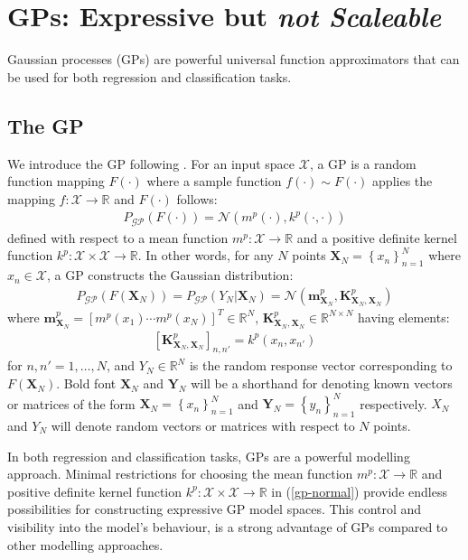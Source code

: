 \documentclass{article}
\newcommand{\GP}{\operatorname{\mathcal{GP}}}
\numberwithin{equation}{section}
\begin{document}
\section{GPs: Expressive but \textit{not Scaleable}}
Gaussian processes (GPs) are powerful universal function approximators that can be used for both regression and classification tasks. 
\subsection{The GP}\label{section:the-gp}
We introduce the GP following \cite{rasmussen2003gaussian}. For an input space $\mathcal{X}$, a GP is a random function mapping $F(\cdot)$ where a sample function $f(\cdot) \sim F(\cdot)$ applies the mapping $f: \mathcal{X} \rightarrow \mathbb{R}$ and $F(\cdot)$ follows:
\begin{align}
    P_{\GP}\left(F\left(\cdot \right)\right) =  \mathcal{N}(m^p(\cdot), k^p(\cdot, \cdot))
    \label{gp-normal}
\end{align}
defined with respect to a mean function $m^p: \mathcal{X} \rightarrow \mathbb{R}$ and a positive definite kernel function $k^p: \mathcal{X} \times \mathcal{X} \rightarrow \mathbb{R}$. In other words, for any $N$ points $\mathbf{X}_N = \left\{ x_n\right\}_{n=1}^N$ where $x_n \in \mathcal{X}$, a GP constructs the Gaussian distribution:
\begin{align}
    \label{gp-vector}
    P_{\GP}\left(F\left(\mathbf{X}_N\right)\right) = P_{\GP}\left(Y_N \vert \mathbf{X}_N\right) = \mathcal{N}\left(\mathbf{m}^p_{\mathbf{X}_N}, \mathbf{K}^{p}_{\mathbf{X}_N, \mathbf{X}_N}\right)
\end{align}
where $\mathbf{m}^p_{\mathbf{X}_N} = \left[ m^p(x_1) \cdots m^p(x_N)\right]^T \in \mathbb{R}^N$, $\mathbf{K}^p_{\mathbf{X}_N, \mathbf{X}_N} \in \mathbb{R}^{N \times N}$ having elements:
\begin{align}
    \left[\mathbf{K}^p_{\mathbf{X}_N, \mathbf{X}_N}\right]_{n, n'} = k^p(x_n, x_{n'})
\end{align}
for $n, n'=1,\dots, N$, and $Y_N \in \mathbb{R}^{N}$ is the random response vector corresponding to $F(\mathbf{X}_N)$. Bold font $\mathbf{X}_N$ and $\mathbf{Y}_N$ will be a shorthand for denoting known vectors or matrices of the form $\mathbf{X}_N = \left\{ x_n\right\}_{n=1}^N$ and $\mathbf{Y}_N = \left\{ y_n\right\}_{n=1}^N$ respectively. $X_N$ and $Y_N$ will denote random vectors or matrices with respect to $N$ points.

In both regression and classification tasks, GPs are a powerful modelling approach. Minimal restrictions for choosing the mean function $m^p: \mathcal{X} \rightarrow \mathbb{R}$ and positive definite kernel function $k^p: \mathcal{X} \times \mathcal{X} \rightarrow \mathbb{R}$ in (\ref{gp-normal}) provide endless possibilities for constructing expressive GP model spaces. This control and visibility into the model's behaviour, is a strong advantage of GPs compared to other modelling approaches. 
\end{document}
